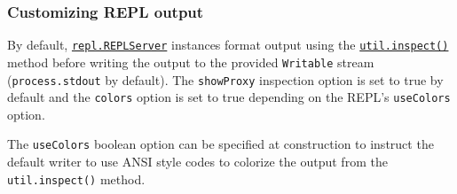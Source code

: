 \begin{Shaded}
\begin{Highlighting}[]
 \OperatorTok{,}\OperatorTok{,}\OperatorTok{,}
  \OperatorTok{;}
  \NormalTok{ \{}
\OperatorTok{=}\OperatorTok{;}
\NormalTok{  \} }
    \NormalTok{ (}
       \NormalTok{(}\OperatorTok{;}
\NormalTok{    \}}
\NormalTok{  \}}
  \NormalTok{(}\OperatorTok{,}\OperatorTok{;}
\NormalTok{\}}

 
   \OperatorTok{===} \NormalTok{) \{}
     \SpecialStringTok{/}\SpecialCharTok{\^{}(}\SpecialCharTok{|}\SpecialCharTok{)}\SpecialStringTok{/}\NormalTok{)}\OperatorTok{;}
\NormalTok{  \}}
   \OperatorTok{;}
\NormalTok{\}}
\end{Highlighting}
\end{Shaded}

\subsubsection{Customizing REPL output}\label{customizing-repl-output}

By default, \hyperref[class-replserver]{\texttt{repl.REPLServer}}
instances format output using the
\href{util.md\#utilinspectobject-options}{\texttt{util.inspect()}}
method before writing the output to the provided \texttt{Writable}
stream (\texttt{process.stdout} by default). The \texttt{showProxy}
inspection option is set to true by default and the \texttt{colors}
option is set to true depending on the REPL's \texttt{useColors} option.

The \texttt{useColors} boolean option can be specified at construction
to instruct the default writer to use ANSI style codes to colorize the
output from the \texttt{util.inspect()} method.

